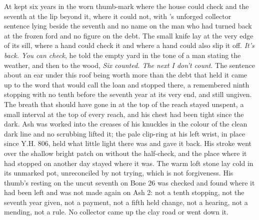 At   kept six years in the worn thumb-mark where the house could check and the seventh at the lip beyond it, where it could not, with 's unforged collector sentence lying beside the seventh and no name on the man who had turned back at the frozen ford and no figure on the debt. The small knife lay at the very edge of its sill, where a hand could check it and where a hand could also slip it off. \emph{It's back. You can check}, he told the empty yard in the tone of a man stating the weather, and then to the wood, \emph{Six counted. The next I don't count}. The sentence about an ear under this roof being worth more than the debt that held it came up to the word that would call the loan and stopped there, a remembered ninth stopping with no tenth before the seventh year at its very end, and still ungiven. The breath that should have gone in at the top of the reach stayed unspent, a small interval at the top of every reach, and his chest had been tight since the dark. Ash was worked into the creases of his knuckles in the colour of the clean dark line and no scrubbing lifted it; the pale clip-ring at his left wrist, in place since Y.H. 806, held what little light there was and gave it back. His stroke went over the shallow bright patch on  without the half-check, and the place where it had stopped on another day stayed where it was. The warm loft stone lay cold in its unmarked pot, unreconciled by not trying, which is not forgiveness. His thumb's resting on the uncut seventh on Bone 26 was checked and found where it had been left and was not made again on Ash 2: not a tenth stopping, not the seventh year given, not a payment, not a fifth held change, not a hearing, not a mending, not a rule. No collector came up the clay road or went down it.

